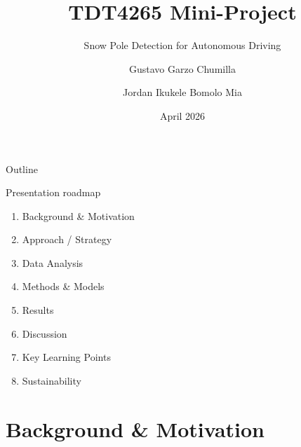 \documentclass[aspectratio=169]{beamer}
\title{TDT4265 Mini-Project}
\subtitle{Snow Pole Detection for Autonomous Driving}
\author[Garzo Chumilla \and Ikukele Bomolo Mia]{Gustavo Garzo Chumilla \and Jordan Ikukele Bomolo Mia}
\institute[NTNU]{NTNU -- Computer Vision and Deep Learning}
\date{April 2026}
\begin{document}
\begin{frame}
  \titlepage
\end{frame}

\begin{frame}{Outline}
  \begin{block}{Presentation roadmap}
    \begin{enumerate}
      \item Background \& Motivation
      \item Approach / Strategy
      \item Data Analysis
      \item Methods \& Models
      \item Results
      \item Discussion
      \item Key Learning Points
      \item Sustainability
    \end{enumerate}
  \end{block}
\end{frame}

\section{Background \& Motivation}
\end{document}
